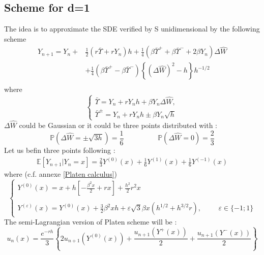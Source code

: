 \documentclass[a4paper,10pt]{article}
\begin{document}
\subsection{Scheme for d=1}
The idea is to approximate the SDE verified by S unidimensional by the following scheme
\begin{equation}
\begin{split}
Y_{n+1}=Y_n+&\frac{1}{2}(r\bar{\Upsilon}+rY_n)h+\frac{1}{4}(\beta\bar{\Upsilon}^+ + \beta\bar{\Upsilon}^-+2\beta Y_n)\Delta\hat{W}\\
&+\frac{1}{4}(\beta\bar{\Upsilon}^+ - \beta\bar{\Upsilon}^-)\left\lbrace(\Delta \hat{W})^2-h \right\rbrace h^{-1/2}\\
\end{split}
\end{equation}
where 
\begin{equation*}
\left\lbrace
\begin{array}{l}
\bar{\Upsilon}=Y_n + rY_nh + \beta Y_n \Delta \hat{W}, \\
\bar{\Upsilon}^{\pm}=Y_n + rY_nh \pm \beta Y_n \sqrt{h}
\end{array}
\right.
\end{equation*}
$\Delta\hat{W}$ could be Gaussian or it could be three points distributed with :
\begin{equation}
\mathbb{P}(\Delta\hat{W}=\pm \sqrt{3h})=\frac{1}{6} \hspace{2cm} \mathbb{P}(\Delta\hat{W}=0)=\frac{2}{3} 
\end{equation}
Let us befin three points following :
\begin{equation}
\begin{split}
\mathbb{E}[Y_{n+1}|Y_n=x]=\frac{2}{3} Y^{(0)}(x) +\frac{1}{6}Y^{(1)}(x) +\frac{1}{6}Y^{(-1)}(x) 
\end{split}
\end{equation}
where (c.f. annexe \ref{Platen calculus})
\begin{equation}
\left\lbrace
\begin{array}{l}
Y^{(0)}(x)           =x+h[-\frac{\beta^2 x}{2}  +rx ] +\frac{h^2}{2}r^2x  \\ \\
Y^{(\varepsilon)}(x) =Y^{(0)}(x)  + \frac{3}{2}\beta^2xh +\varepsilon\sqrt{3}\beta x (h^{1/2}+h^{3/2}r),  \hspace{1cm}  \varepsilon \in \{-1;1\}
\end{array}
\right.
\end{equation}
The semi-Lagrangian version of Platen scheme will be : 
\begin{equation}
u_n(x) = \frac{e^{-rh}}{3}\left\lbrace2u_{n+1}(Y^{(0)}(x))+ \frac{u_{n+1}(Y^{+}(x))}{2}+ \frac{u_{n+1}(Y^{-}(x))}{2}\right\rbrace
\end{equation}
\end{document}
